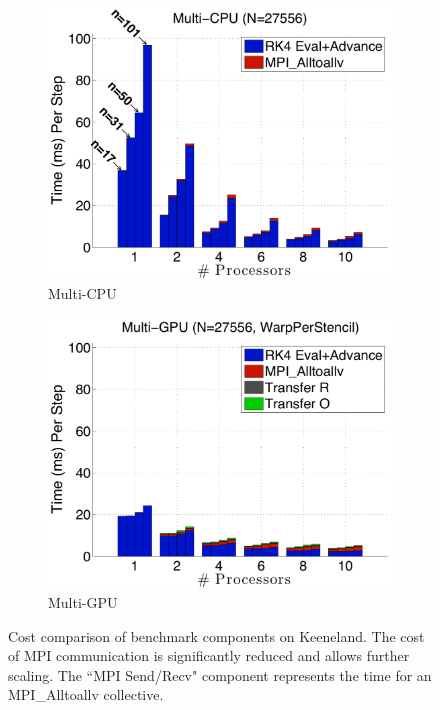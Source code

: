 \begin{figure}
\centering
\begin{subfigure}[t]{0.425\textwidth}
\centering
\includegraphics[width=1.0\textwidth]{../figures/keeneland_results/alltoallv_cosine/multiCPU_costs.pdf}
\caption{Multi-CPU}
\label{fig:alltoall_multicpu_costs}
\end{subfigure} 
\begin{subfigure}[t]{0.425\textwidth}
\centering
\includegraphics[width=1.0\textwidth]{../figures/keeneland_results/alltoallv_cosine/multiGPU_warp_costs.pdf}
\caption{Multi-GPU}
\label{fig:alltoall_multigpu_costs}
\end{subfigure} 
\caption{Cost comparison of benchmark components on Keeneland. The cost of MPI communication is significantly reduced and allows further scaling. The ``MPI Send/Recv" component represents the time for an MPI\_Alltoallv collective.}
\end{figure} 

